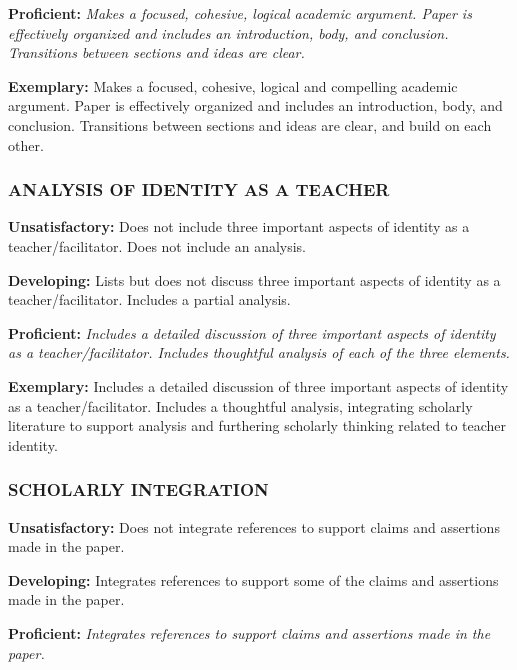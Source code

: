 \documentclass[
]{book}
\begin{document}
\textbf{Proficient:} \emph{Makes a focused, cohesive, logical academic argument. Paper is effectively organized and includes an introduction, body, and conclusion. Transitions between sections and ideas are clear.}

\textbf{Exemplary:} Makes a focused, cohesive, logical and compelling academic argument. Paper is effectively organized and includes an introduction, body, and conclusion. Transitions between sections and ideas are clear, and build on each other.

\hypertarget{analysis-of-identity-as-a-teacher}{%
\subsubsection*{ANALYSIS OF IDENTITY AS A TEACHER}\label{analysis-of-identity-as-a-teacher}}

\textbf{Unsatisfactory:} Does not include three important aspects of identity as a teacher/facilitator. Does not include an analysis.

\textbf{Developing:} Lists but does not discuss three important aspects of identity as a teacher/facilitator. Includes a partial analysis.

\textbf{Proficient:} \emph{Includes a detailed discussion of three important aspects of identity as a teacher/facilitator. Includes thoughtful analysis of each of the three elements.}

\textbf{Exemplary:} Includes a detailed discussion of three important aspects of identity as a teacher/facilitator. Includes a thoughtful analysis, integrating scholarly literature to support analysis and furthering scholarly thinking related to teacher identity.

\hypertarget{scholarly-integration}{%
\subsubsection*{SCHOLARLY INTEGRATION}\label{scholarly-integration}}

\textbf{Unsatisfactory:} Does not integrate references to support claims and assertions made in the paper.

\textbf{Developing:} Integrates references to support some of the claims and assertions made in the paper.

\textbf{Proficient:} \emph{Integrates references to support claims and assertions made in the paper.}
\end{document}
